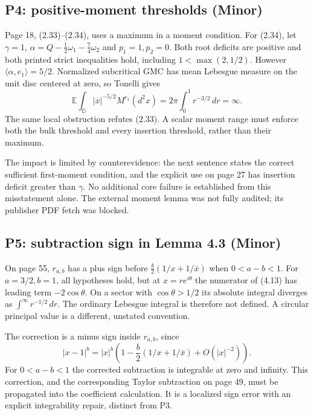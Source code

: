 \documentclass[10pt]{article}
\begin{document}
\subsection*{P4: positive-moment thresholds (Minor)}
Page 18, (2.33)–(2.34), uses a maximum in a moment condition. For (2.34), let \(\gamma=1\), \(\alpha=Q-\frac12\omega_1-\frac74\omega_2\) and \(p_1=1,p_2=0\). Both root deficits are positive and both printed strict inequalities hold, including \(1<\max(2,1/2)\). However \(\langle\alpha,e_1\rangle=5/2\). Normalized subcritical GMC has mean Lebesgue measure on the unit disc centered at zero, so Tonelli gives \[\mathbb E\int_{\mathbb D}|x|^{-5/2}M^{e_1}(d^2x)
 =2\pi\int_0^1r^{-3/2}\,dr=\infty.\] The same local obstruction refutes (2.33). A scalar moment range must enforce both the bulk threshold and every insertion threshold, rather than their maximum.\par
The impact is limited by counterevidence: the next sentence states the correct sufficient first-moment condition, and the explicit use on page 27 has insertion deficit greater than \(\gamma\). No additional core failure is established from this misstatement alone. The external moment lemma was not fully audited; its publisher PDF fetch was blocked.\par
\subsection*{P5: subtraction sign in Lemma 4.3 (Minor)}
On page 55, \(r_{a,b}\) has a plus sign before \(\frac b2(1/x+1/\bar x)\) when \(0<a-b<1\). For \(a=3/2,b=1\), all hypotheses hold, but at \(x=re^{i\theta}\) the numerator of (4.13) has leading term \(-2\cos\theta\). On a sector with \(\cos\theta>1/2\) its absolute integral diverges as \(\int^\infty r^{-1/2}\,dr\). The ordinary Lebesgue integral is therefore not defined. A circular principal value is a different, unstated convention.\par
The correction is a minus sign inside \(r_{a,b}\), since \[|x-1|^b=|x|^b
 \left(1-\frac b2(1/x+1/\bar x)+O(|x|^{-2})\right).\] For \(0<a-b<1\) the corrected subtraction is integrable at zero and infinity. This correction, and the corresponding Taylor subtraction on page 49, must be propagated into the coefficient calculation. It is a localized sign error with an explicit integrability repair, distinct from P3.\par
\end{document}
